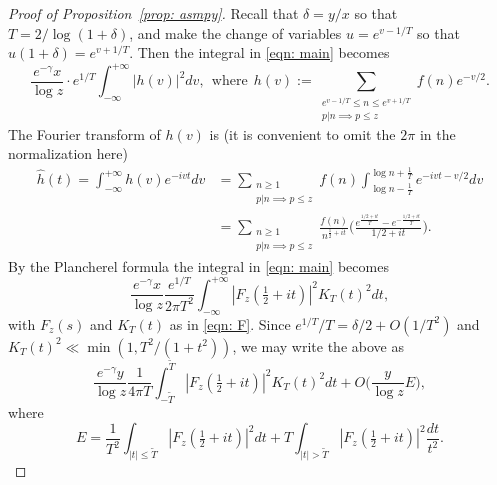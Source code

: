 \documentclass[12pt, notitlepage]{amsart}
\numberwithin{equation}{section}
\def\TT{\widetilde{T}}
\theoremstyle{remark}
\theoremstyle{definition}
\theoremstyle{remark}
\numberwithin{equation}{section}
\begin{document}
\begin{proof}[Proof of Proposition~\ref{prop: asmpy}]
Recall that $\delta= y/x$ so that $T=2/\log (1+\delta)$, and make the change of variables $u=e^{v-1/T}$ so that $u(1+\delta) = e^{v+1/T}$.  
Then the integral in \eqref{eqn: main} becomes  
  $$
   \frac{e^{-\gamma }x}{\log z} 
 \cdot e^{1/T} \int_{-\infty}^{+\infty}  |h(v)|^{2} dv, 
 \ \ \text{where} \ \  
   h(v):= \sum_{\substack{e^{v-1/T} \le n \le e^{v+ 1/T} \\ p|n \implies p\le z}} f(n) e^{-v/2}.
  $$
   The Fourier transform of $h(v)$ is (it is convenient to omit the $2\pi$ in the normalization here)  
\begin{align*}
    \hat{h}(t) = \int_{-\infty}^{+\infty} h(v)e^{-i vt } dv &= \sum_{\substack{n\ge 1 \\ p|n\implies p \leq z}} f(n) \int_{\log n - \frac{1}{T}}^{\log n + \frac{1}{T}} e^{-i v t -v/2} dv\\ &= \sum_{\substack{n\ge 1\\ p|n\implies p \leq z}} \frac{f(n)}{n^{\frac{1}{2}+ i t}} \Big( \frac{e^{\frac{1/2+it}{T}} - e^{-\frac{1/2+ i t }{T} }}{1/2+it}\Big). 
\end{align*}
By the Plancherel formula the integral in \eqref{eqn: main} becomes  
\[  
\frac{e^{-\gamma} x}{\log z}  \frac{e^{1/T}}{2\pi T^2}  \int_{-\infty}^{+\infty} |F_z(\tfrac 12+it)|^2 K_T(t)^2 dt, 
\] 
with $F_z(s)$ and $K_T(t)$ as in \eqref{eqn: F}.   %
Since $e^{1/T}/T = \delta/2 + O(1/T^2)$ and $K_T(t)^2 \ll \min (1, T^2/(1+t^2))$, we may write the above as 
\begin{equation} 
\label{2.8} 
\frac{e^{-\gamma} y}{\log z} \frac{1}{4\pi T} \int_{-\TT}^{\TT} |F_z(\tfrac 12+it)|^2 K_T(t)^2 dt + O\Big( \frac{y}{\log z} E \Big), 
\end{equation} 
where 
\begin{equation} 
\label{2.9} 
E = \frac{1}{T^2} \int_{|t|\le \TT} |F_z(\tfrac 12+it)|^2 dt + T \int_{|t| > \TT} |F_z(\tfrac 12+it)|^2 \frac{dt}{t^2}. 
\end{equation} 


\end{proof}
\end{document}
